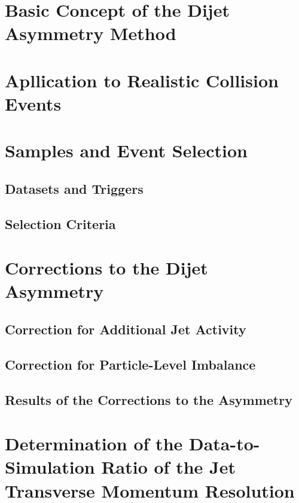 \section{Basic Concept of the Dijet Asymmetry Method}
\label{sec:jer_method}

\section{Apllication to Realistic Collision Events}
\label{sec:jer_application}

\section{Samples and Event Selection}
\label{sec:jer_selection}

\subsection{Datasets and Triggers}
\label{subsec:jer_samples_and_trigger}

\subsection{Selection Criteria}
\label{subsec:jer_sel_cuts}

\section{Corrections to the Dijet Asymmetry}
\label{sec:jer_corrections}

\subsection{Correction for Additional Jet Activity}
\label{subsec:jer_corrections_alpha}

\subsection{Correction for Particle-Level Imbalance}
\label{subsec:jer_corrections_pli}

\subsection{Results of the Corrections to the Asymmetry}
\label{subsec:jer_corrections_results}

\section[Determination of the Data-to-Simulation Ratio]{Determination of the Data-to-Simulation Ratio of the Jet Transverse Momentum Resolution}
\label{sec:jer_ratio_determination}

